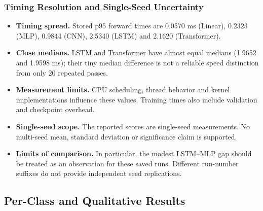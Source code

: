 \subsubsection{Timing Resolution and Single-Seed Uncertainty}
\begin{itemize}
\setlength{\itemsep}{3pt}
\setlength{\parskip}{0pt}
\item \textbf{Timing spread.} Stored p95 forward times are 0.0570 ms (Linear), 0.2323 (MLP), 0.9844 (CNN), 2.5340 (LSTM) and 2.1620 (Transformer).
\item \textbf{Close medians.} LSTM and Transformer have almost equal medians (1.9652 and 1.9598 ms); their tiny median difference is not a reliable speed distinction from only 20 repeated passes.
\item \textbf{Measurement limits.} CPU scheduling, thread behavior and kernel implementations influence these values. Training times also include validation and checkpoint overhead.

\item \textbf{Single-seed scope.} The reported scores are single-seed measurements. No multi-seed mean, standard deviation or significance claim is supported.
\item \textbf{Limits of comparison.} In particular, the modest LSTM--MLP gap should be treated as an observation for these saved runs. Different run-number suffixes do not provide independent seed replications.
\end{itemize}

\subsection{Per-Class and Qualitative Results}
